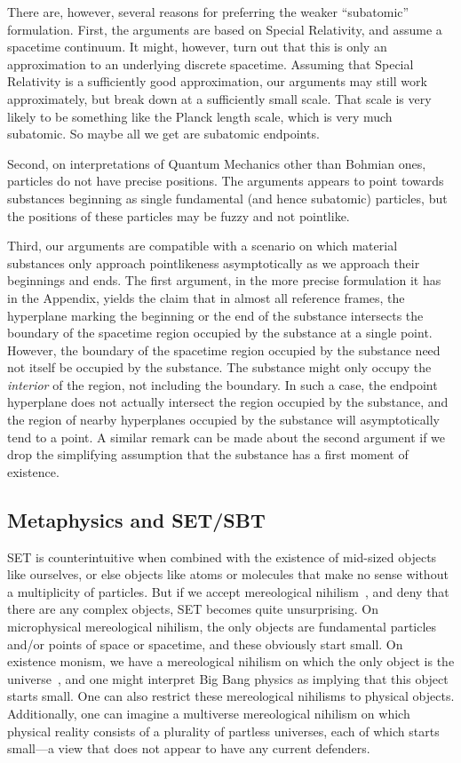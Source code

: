 There are, however, several reasons for preferring the weaker ``subatomic'' formulation. First, the arguments are based
on Special Relativity, and assume a spacetime continuum. It might, however, turn out that this is only an approximation 
to an underlying discrete spacetime. Assuming that Special Relativity is a sufficiently good approximation, our arguments may 
still work approximately, but break down at a sufficiently small scale. That scale is very likely to be something like the 
Planck length scale, which is very much subatomic. So maybe all we get are subatomic endpoints.

Second, on interpretations of Quantum Mechanics other than Bohmian ones, particles do not have precise positions. The arguments 
appears to point towards substances beginning as single fundamental (and hence subatomic) particles, but the positions of these
particles may be fuzzy and not pointlike. 

Third, our arguments are compatible with a scenario on which material substances only approach pointlikeness asymptotically
as we approach their beginnings and ends. The first argument, in the more precise formulation it has in the 
Appendix, yields the claim that in almost all reference frames, the hyperplane marking the beginning or the end of the 
substance intersects the boundary of the spacetime region occupied by the substance at a single point. However, the boundary
of the spacetime region occupied by the substance need not itself be occupied by the substance. The substance might only 
occupy the \textit{interior} of the region, not including the boundary. In such a case, the endpoint hyperplane does not actually
intersect the region occupied by the substance, and the region of nearby hyperplanes occupied by the substance will asymptotically
tend to a point.  A similar remark can be made about the second argument if we drop the simplifying assumption that
the substance has a first moment of existence.

\subsection{Metaphysics and SET/SBT}
SET is counterintuitive when combined with the existence of mid-sized objects like ourselves, or else objects like atoms or molecules that make no sense without a multiplicity of particles.  But if we accept mereological nihilism~\parencite{SiderNihilism}, and deny that there are any complex objects, SET becomes quite unsurprising. On microphysical mereological nihilism, the only objects are fundamental particles and/or points of space or spacetime, and these obviously start small. On existence monism, we have a mereological nihilism on which the only object is the universe~\parencite{HorganPotrc}, and one might interpret Big Bang physics as implying that this object starts small. One can also restrict these mereological nihilisms to physical objects. Additionally, one can imagine a multiverse mereological nihilism on which physical reality consists of a plurality of partless universes, each of which starts small---a view that does not appear to have any current defenders.

